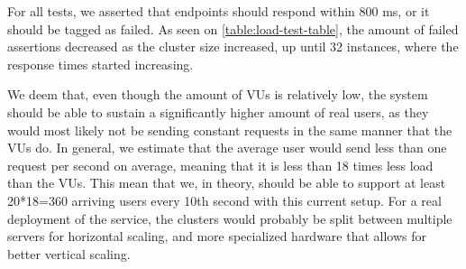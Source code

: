 For all tests, we asserted that endpoints should respond within 800 ms, or it should be tagged as failed.
As seen on \autoref{table:load-test-table}, the amount of failed assertions decreased as the cluster size increased, up until 32 instances, where the response times started increasing.

We deem that, even though the amount of VUs is relatively low, the system should be able to sustain a significantly higher amount of real users, as they would most likely not be sending constant requests in the same manner that the VUs do.
In general, we estimate that the average user would send less than one request per second on average, meaning that it is less than 18 times less load than the VUs.
This mean that we, in theory, should be able to support at least 20*18=360 arriving users every 10th second with this current setup.
For a real deployment of the service, the clusters would probably be split between multiple servers for horizontal scaling, and more specialized hardware that allows for better vertical scaling.
